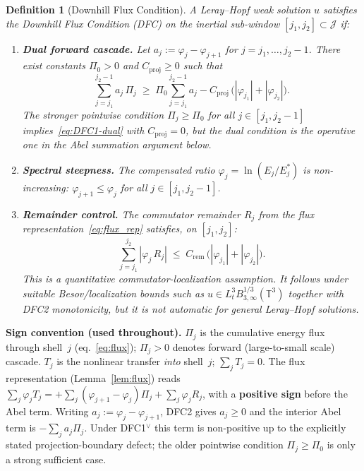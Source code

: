 \documentclass[12pt,a4paper]{article}
\theoremstyle{breakdef}
\newtheorem{definition}{Definition}[section]
\theoremstyle{breakplain}
\theoremstyle{breakdef}
\begin{document}
\begin{definition}[Downhill Flux Condition]\label{def:DFC}
A Leray--Hopf weak solution $u$ satisfies the \emph{Downhill Flux
Condition} (DFC) on the inertial sub-window
$[j_1, j_2] \subset \mathcal{J}$ if:
\begin{enumerate}
  \item[\textup{(DFC1$^\vee$)}] \textbf{Dual forward cascade.}\;
    Let $a_j := \varphi_j-\varphi_{j+1}$ for
    $j=j_1,\ldots,j_2-1$. There exist constants
    $\Pi_0>0$ and $C_{\mathrm{proj}}\ge0$ such that
    \begin{equation}\label{eq:DFC1-dual}
      \sum_{j=j_1}^{j_2-1} a_j\,\Pi_j
      \;\ge\;
      \Pi_0\sum_{j=j_1}^{j_2-1} a_j
      -
      C_{\mathrm{proj}}\,
      \bigl(|\varphi_{j_1}|+|\varphi_{j_2}|\bigr).
    \end{equation}
    The stronger pointwise condition $\Pi_j\ge\Pi_0$ for all
    $j\in[j_1,j_2-1]$ implies~\eqref{eq:DFC1-dual} with
    $C_{\mathrm{proj}}=0$, but the dual condition is the operative one
    in the Abel summation argument below.
  \item[\textup{(DFC2)}] \textbf{Spectral steepness.}\quad
    The compensated ratio $\varphi_j = \ln(E_j/E_j^*)$ is non-increasing:
    $\varphi_{j+1} \le \varphi_j$ for all $j \in [j_1, j_2-1]$.
  \item[\textup{(DFC3)}] \textbf{Remainder control.}\quad
    The commutator remainder $R_j$ from the flux
    representation~\eqref{eq:flux_rep} satisfies, on $[j_1, j_2]$:
    \begin{equation}\label{eq:DFC3-concrete}
      \sum_{j=j_1}^{j_2} |\varphi_j\,R_j|
      \;\le\;
      C_{\mathrm{rem}}\,
      \bigl(|\varphi_{j_1}| + |\varphi_{j_2}|\bigr).
    \end{equation}
    This is a quantitative commutator-localization assumption. It follows
    under suitable Besov/localization bounds such as
    $u \in L^3_t B^{1/3}_{3,\infty}(\mathbb{T}^3)$ together with DFC2
    monotonicity, but it is not automatic for general Leray--Hopf
    solutions.
\end{enumerate}
\end{definition}

\noindent
\textbf{Sign convention (used throughout).}\quad
$\Pi_j$ is the cumulative energy flux through shell~$j$
(eq.~\eqref{eq:flux}); $\Pi_j > 0$ denotes forward (large-to-small
scale) cascade. $T_j$ is the nonlinear transfer \emph{into} shell~$j$;
$\sum_j T_j = 0$. The flux representation (Lemma~\ref{lem:flux}) reads
$\sum_j \varphi_j T_j = +\sum_j(\varphi_{j+1}-\varphi_j)\Pi_j +
\sum_j \varphi_j R_j$, with a \textbf{positive sign} before the Abel
term. Writing $a_j:=\varphi_j-\varphi_{j+1}$, DFC2 gives $a_j\ge0$ and
the interior Abel term is $-\sum_j a_j\Pi_j$. Under DFC1$^\vee$ this
term is non-positive up to the explicitly stated projection-boundary
defect; the older pointwise condition $\Pi_j\ge\Pi_0$ is only a strong
sufficient case.
\end{document}
